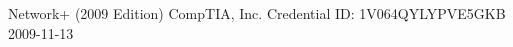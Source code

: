 \awarditem
    {Network+ (2009 Edition)}
    {CompTIA, Inc.}
    {Credential ID: 1V064QYLYPVE5GKB}
    {2009-11-13}